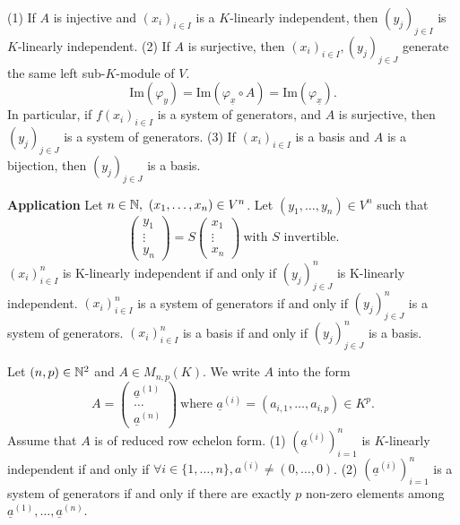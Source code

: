 \begin{propositionenv}
\quad 
\newline
(1) If $A$ is injective and $(x_i)_{i\in I}$ is a $K$-linearly independent, then $(y_j)_{j\in I}$ is  $K$-linearly independent.
\newline
(2) If $A$ is surjective, then $(x_i)_{i\in I},(y_j)_{j\in J}$ generate the same left sub-$K$-module of $V$.
$$\mathrm{Im}(\varphi_y)=\mathrm{Im}(\varphi_{\underline{x}}\circ A)=\mathrm{Im}(\varphi_{\underline{x}}).$$
In particular, if $f(x_i)_{i\in I}$ is a system of generators, and $A$ is surjective, then $(y_j)_{j\in J}$ is a system of generators.
\newline
(3) If $(x_i)_{i\in I}$ is a basis and $A$ is a bijection, then $(y_j)_{j\in J}$ is a basis.
\end{propositionenv}
\begin{box2}
\textbf{Application} \quad Let $n\in \mathbb{N},\ (x_1,\dots,x_n)\in V^n$. Let $(y_1,\dots,y_n)\in V^n$ such that 
$$\begin{pmatrix}
y_1\\
\vdots\\
y_n
\end{pmatrix}=S\begin{pmatrix}
x_1\\
\vdots\\
x_n
\end{pmatrix}\ \text{with } S \text{ invertible.} $$ 
$(x_i)_{i\in I}^n$ is K-linearly independent if and only if $(y_j)_{j\in J}^n$ is K-linearly independent. 
\newline
$(x_i)_{i\in I}^n$ is a system of generators if and only if $(y_j)_{j\in J}^n$ is a system of generators.
\newline
$(x_i)_{i\in I}^n$ is a basis if and only if $(y_j)_{j\in J}^n$ is a basis.  
\end{box2}
\begin{theoremenv}
    Let $(n,p)\in \mathbb{N}^2$ and $A\in M_{n,p}(K)$. We write $A$ into the form 
    $$A=\begin{pmatrix}
    \underline{a}^{(1)}\\
    \dots\\
    \underline{a}^{(n)}
    \end{pmatrix}\ \text{where } \underline{a}^{(i)}=(a_{i,1},\dots,a_{i,p})\in K^p.$$
Assume that $A$ is of reduced row echelon form. 
\newline
(1) $\left(\underline{a}^{(i)}\right)^n_{i=1}$ is $K$-linearly independent if and only if $\forall i\in \{1,\dots,n\},a^{(i)}\not=(0,\dots,0)$.
\newline
(2) $\left(\underline{a}^{(i)}\right)^n_{i=1}$ is a system of generators if and only if there are exactly $p$ non-zero elements among $\underline{a}^{(1)},\dots,\underline{a}^{(n)}$.

\end{theoremenv}
